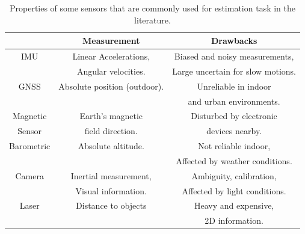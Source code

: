 \begin{table}[ht]
	\centering
	\setlength{\tabcolsep}{4pt} %
	\renewcommand{\arraystretch}{1.5} %
	\begin{tabular}{|c|c|c|}
		\toprule
		& \textbf{Measurement} & \textbf{Drawbacks} \\
		\midrule
		IMU & Linear Accelerations, & Biased and noisy measurements, \\
		& Angular velocities.   & Large uncertain for slow motions.\\
		
		\midrule
		GNSS & Absolute position (outdoor). & Unreliable in indoor \\
		&                              & and urban environments. \\
		\midrule
		Magnetic  & Earth's magnetic  & Disturbed by electronic \\
		Sensor    & field direction.  & devices nearby. \\
		\midrule
		Barometric & Absolute altitude. & Not reliable indoor, \\
		&					& Affected by weather conditions. \\
		\midrule							   
		Camera & Inertial measurement, & Ambiguity, calibration, \\
		& Visual information.   & Affected by light conditions. \\
		
		\midrule
		Laser & Distance to objects & Heavy and expensive, \\
		&  					& 2D information. \\
		\bottomrule
	\end{tabular}
	\caption{Properties of some sensors that are commonly used for estimation task in the literature.}
	\label{sensors_table}
\end{table}

